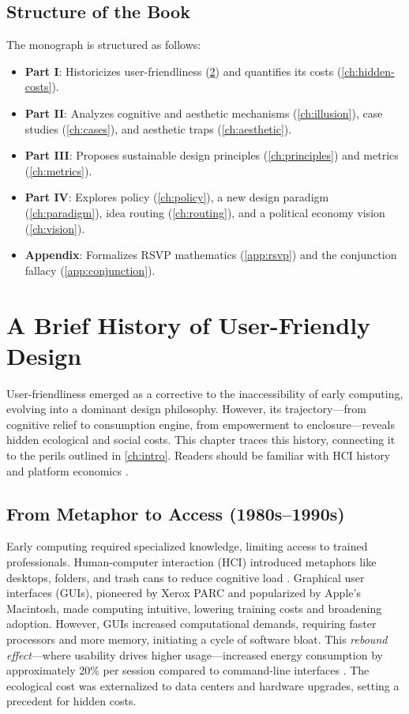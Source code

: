 \section{Structure of the Book}
\label{sec:intro-structure}
The monograph is structured as follows:
\begin{itemize}
  \item \textbf{Part I}: Historicizes user-friendliness (\cref{ch:history}) and quantifies its costs (\cref{ch:hidden-costs}).
  \item \textbf{Part II}: Analyzes cognitive and aesthetic mechanisms (\cref{ch:illusion}), case studies (\cref{ch:cases}), and aesthetic traps (\cref{ch:aesthetic}).
  \item \textbf{Part III}: Proposes sustainable design principles (\cref{ch:principles}) and metrics (\cref{ch:metrics}).
  \item \textbf{Part IV}: Explores policy (\cref{ch:policy}), a new design paradigm (\cref{ch:paradigm}), idea routing (\cref{ch:routing}), and a political economy vision (\cref{ch:vision}).
  \item \textbf{Appendix}: Formalizes RSVP mathematics (\cref{app:rsvp}) and the conjunction fallacy (\cref{app:conjunction}).
\end{itemize}

\chapter{A Brief History of User-Friendly Design}
\label{ch:history}

User-friendliness emerged as a corrective to the inaccessibility of early computing, evolving into a dominant design philosophy. However, its trajectory---from cognitive relief to consumption engine, from empowerment to enclosure---reveals hidden ecological and social costs. This chapter traces this history, connecting it to the perils outlined in \cref{ch:intro}. Readers should be familiar with HCI history and platform economics \citep{norman1988,doctorow2022}.

\section{From Metaphor to Access (1980s--1990s)}
\label{sec:history-metaphor}
Early computing required specialized knowledge, limiting access to trained professionals. Human-computer interaction (HCI) introduced metaphors like desktops, folders, and trash cans to reduce cognitive load \citep{norman1988}. Graphical user interfaces (GUIs), pioneered by Xerox PARC and popularized by Apple’s Macintosh, made computing intuitive, lowering training costs and broadening adoption. However, GUIs increased computational demands, requiring faster processors and more memory, initiating a cycle of software bloat. This \emph{rebound effect}---where usability drives higher usage---increased energy consumption by approximately 20\% per session compared to command-line interfaces \citep{extentia2024}. The ecological cost was externalized to data centers and hardware upgrades, setting a precedent for hidden costs.

